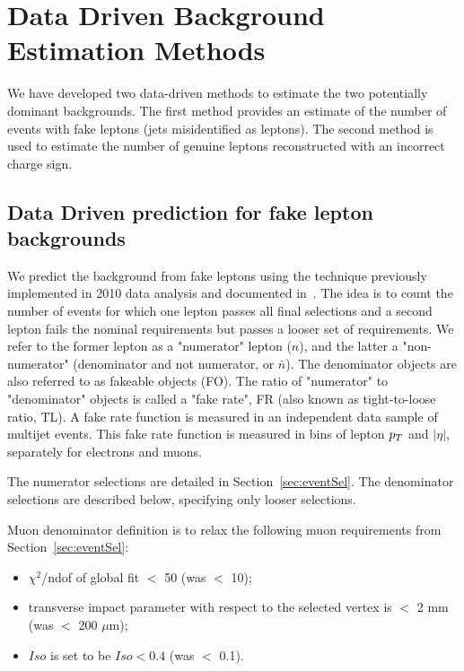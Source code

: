 \section{Data Driven Background Estimation Methods}
\label{sec:datadriven}

We have developed two data-driven methods to 
estimate the two potentially dominant backgrounds.
The first method provides an estimate of the number of events with fake leptons (jets misidentified as leptons).
The second method is used to estimate the number of genuine leptons reconstructed with an incorrect charge sign.

\subsection{Data Driven prediction for fake lepton backgrounds}
\label{sec:fakes}

We predict the background from fake leptons using the technique previously implemented in 2010 data analysis
and documented in~\cite{frmethod}.
The idea is to count the number of events for which one lepton passes all final selections and a second lepton
fails the nominal requirements but passes a looser set of requirements. 
We refer to the former lepton as a "numerator" lepton ($n$),
and the latter a "non-numerator" (denominator and not numerator, or $\bar{n}$).
The denominator objects are also referred to as fakeable objects (FO).
The ratio of "numerator" to "denominator" objects is called a "fake rate",
 FR (also known as tight-to-loose ratio, TL).  
A fake rate function is measured in an independent data sample of multijet events.
This fake rate function is measured in bins of lepton $p_T$ and $|\eta |$,
separately for electrons and muons. 

The numerator selections are detailed in Section~\ref{sec:eventSel}. 
The denominator selections are described below, specifying only looser selections.

Muon denominator definition is to relax the following muon requirements from
Section~\ref{sec:eventSel}:
\begin{itemize}
\item $\chi^2$/ndof of global fit $<$ 50 (was $<$ 10);
\item transverse impact parameter with respect to the selected vertex is
$<$ 2 mm (was $<$ 200 $\mu$m);
\item $Iso$ is set to be $Iso < 0.4$  (was $<$ 0.1).
\end{itemize}

